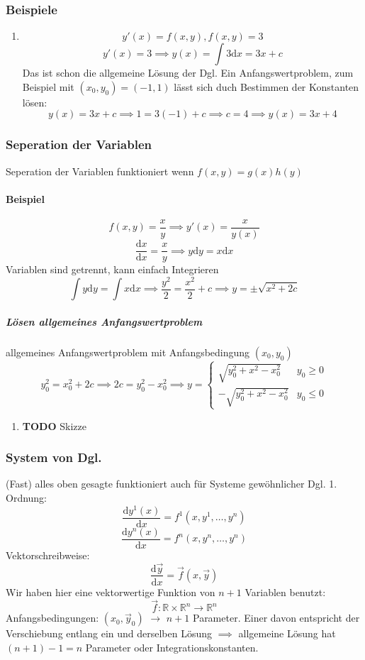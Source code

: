 \documentclass[a4paper]{scrartcl}
\renewcommand{\d}{\mathrm{d}}
\newcommand{\f}[2]{\frac{#1}{#2}}
\renewcommand{\v}[1]{\vec{#1}}
\theoremstyle{definition}
\theoremstyle{plain}
\theoremstyle{remark}
\theoremstyle{remark}
\begin{document}
\subsubsection{Beispiele}
\label{sec-3-3-5}
\begin{enumerate}
\item \[y'(x) = f(x,y), f(x,y) = 3\]
\[y'(x) = 3 \implies y(x) = \int 3\d x = 3 x + c\]
Das ist schon die allgemeine Lösung der Dgl.
Ein Anfangswertproblem, zum Beispiel mit $(x_0, y_0) = (-1,1)$ lässt sich duch Bestimmen der Konstanten lösen:
\[y(x) = 3 x + c \implies 1 = 3(-1) + c \implies c = 4 \implies y(x) = 3x + 4\]
\end{enumerate}
\subsubsection{Seperation der Variablen}
\label{sec-3-3-6}
Seperation der Variablen funktioniert wenn $f(x,y) = g(x)h(y)$
\paragraph{Beispiel}
\label{sec-3-3-6-1}
\[f(x,y) = \f{x}{y} \implies y'(x) = \f{x}{y(x)}\]
\[\f{\d x}{\d x} = \f{x}{y} \implies y\d y = x\d x\]
Variablen sind getrennt, kann einfach Integrieren
\[\int y\d y = \int x\d x \implies \f{y^2}{2} = \f{x^2}{2} + c \implies y = \pm \sqrt{x^2 + 2c}\]
\subparagraph{Lösen allgemeines Anfangswertproblem}
\label{sec-3-3-6-1-1}
allgemeines Anfangswertproblem mit Anfangsbedingung $(x_0,y_0)$
\[y_0^2 = x_0^2 + 2c \implies 2c = y_0^2 - x_0^2 \implies y = \begin{cases} \sqrt{y_0^2 + x^2 - x_0^2} & y_0 \geq 0 \\ -\sqrt{y_0^2 + x^2 - x_0^2} & y_0 \leq 0 \end{cases}\]
\begin{enumerate}
\item {\bfseries\sffamily TODO} Skizze
\label{sec-3-3-6-1-1-1}
\end{enumerate}
\subsubsection{System von Dgl.}
\label{sec-3-3-7}
(Fast) alles oben gesagte funktioniert auch für Systeme gewöhnlicher Dgl. 1. Ordnung:
\[\f{\d y^1(x)}{\d x} = f^1(x,y^1,\ldots,y^n)\]
\[\f{\d y^n(x)}{\d x} = f^n(x,y^n,\ldots,y^n)\]
Vektorschreibweise:
\[\f{\d \v y}{\d x} = \v f(x,\v y)\]
Wir haben hier eine vektorwertige Funktion von $n+1$ Variablen benutzt:
\[\v f:\mathbb{R}\times\mathbb{R}^n\to \mathbb{R}^n\]
Anfangsbedingungen: $(x_0,\v{y}_0)$ $\rightarrow$ $n+1$ Parameter. Einer davon entspricht der Verschiebung entlang ein und derselben Lösung $\implies$ allgemeine Lösung hat $(n + 1) - 1 = n$ Parameter oder Integrationskonstanten.
\end{document}
